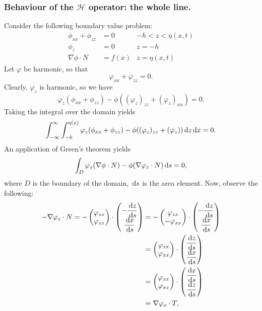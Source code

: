 \documentclass[10pt,reqno,oneside,a4paper]{article}
\begin{document}
\subsubsection{Behaviour of the $\mathcal{H}$ operator: the whole line.}
Consider the following boundary value problem:
\begin{subequations}
\begin{align}
\phi_{xx} + \phi_{zz} &= 0 &-h < z < \eta(x,t) \\
\phi_{z} &= 0 &z = -h \\
\nabla  \phi \cdot N &= f(x )& z = \eta(x,t)
\end{align}
\end{subequations}
Let $\varphi$ be harmonic, so that 
\[ \varphi_{xx} + \varphi_{zz} = 0. \] Clearly, $\varphi_z$ is harmonic, so we have
\[ \varphi_z(\phi_{xx} + \phi_{zz}) - \phi((\varphi_z)_{zz} + (\varphi_{z})_{xx}) = 0. \]
Taking the integral over the domain yields
\[ \int^{\infty}_{-\infty} \int^{\eta(x)}_{-h} \varphi_z(\phi_{xx} + \phi_{zz}) - \phi((\varphi_z)_{zz} + (\varphi_{z})) \,\mathrm{d} z \,\mathrm{d} x = 0.\]
An application of Green's theorem yields 
\[ \int_D \varphi_z(\nabla  \phi \cdot N) - \phi(\nabla  \varphi_z \cdot N) \,\mathrm{d} s = 0,\]
where $D$ is the boundary of the domain, $\,\mathrm{d} s$ is the area element. Now, observe the following:
\begin{align*}
- \nabla  \varphi_z \cdot N = - \begin{pmatrix} \varphi_{zx} \\ \varphi_{zz} \end{pmatrix} \cdot \begin{pmatrix} - \dfrac{\,\mathrm{d} z}{\,\mathrm{d} s} \\ \dfrac{\,\mathrm{d} x}{\,\mathrm{d} s} \end{pmatrix} &=  - \begin{pmatrix} \varphi_{zx} \\ - \varphi_{xx} \end{pmatrix} \cdot \begin{pmatrix} - \dfrac{\,\mathrm{d} z}{\,\mathrm{d} s} \\ \dfrac{\,\mathrm{d} x}{\,\mathrm{d} s} \end{pmatrix} \\
&= \begin{pmatrix} \varphi_{zx} \\ \varphi_{xx} \end{pmatrix} \cdot \begin{pmatrix} \dfrac{\,\mathrm{d} z}{\,\mathrm{d} s} \\ \dfrac{\,\mathrm{d} x}{\,\mathrm{d} s} \end{pmatrix} \\
&= \begin{pmatrix} \varphi_{xx} \\ \varphi_{xz} \end{pmatrix} \cdot \begin{pmatrix} \dfrac{\,\mathrm{d} x}{\,\mathrm{d} s} \\ \dfrac{\,\mathrm{d} z}{\,\mathrm{d} s} \end{pmatrix} \\
&= \nabla  \varphi_x \cdot T,
\end{align*}
\end{document}
